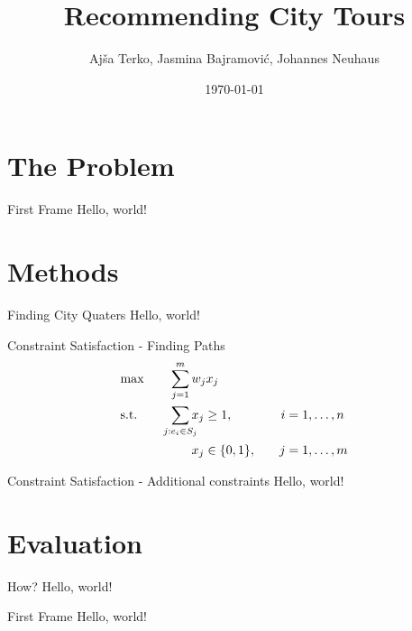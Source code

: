 \documentclass{beamer}
\title{Recommending City Tours}
\date{\today}
\author{Ajša Terko, Jasmina Bajramović, Johannes Neuhaus}
\institute{\url{https://github.com/zonradkuse/city-tour-recsys}}
\begin{document}
  \maketitle
  \section{The Problem}
  \begin{frame}{First Frame}
    Hello, world!
  \end{frame}
  \section{Methods}
  \begin{frame}{Finding City Quaters}
    Hello, world!
  \end{frame}
  \begin{frame}{Constraint Satisfaction - Finding Paths}
    \begin{alignat*}{2}
      & \text{max} & & \sum_{j=1}^{m} w_{j}x_{j} \\
       & \text{s.t.}& \quad & \sum_{\mathclap{{j:e_{i} \in S_{j}}}}\begin{aligned}[t]
                        x_{j} & \geq 1,& i & =1, \dots, n\\[3ex]
                      x_{j} & \in \{0,1\}, & \quad j &=1 ,\dots, m
                    \end{aligned}
    \end{alignat*}
  \end{frame}
  \begin{frame}{Constraint Satisfaction - Additional constraints}
    Hello, world!
  \end{frame}
  \section{Evaluation}
  \begin{frame}{How?}
    Hello, world!
  \end{frame}
  \begin{frame}{First Frame}
    Hello, world!
  \end{frame}
\end{document}

